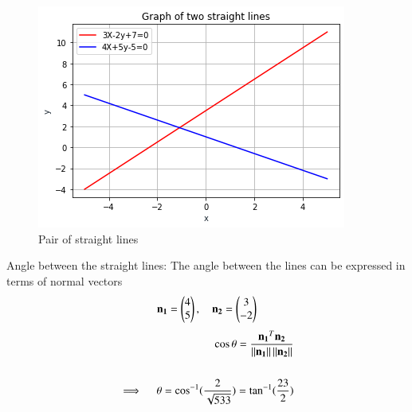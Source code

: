 \begin{figure}[h]
    \centering
    \includegraphics[width=\columnwidth]{./solutions/13/ex1/Figure.png}
    \caption{Pair of straight lines}
    \label{eq:solutions/13/ex1/Fig :1}
\end{figure}
{Angle between the straight lines: }
The angle between the lines can be expressed in terms of normal vectors 
\begin{align}
	\mathbf{n_1}=\begin{pmatrix}4\\5\end{pmatrix} , \quad \mathbf{n_2}=\begin{pmatrix}3\\-2\end{pmatrix}
\end{align}
\begin{align}
	\cos\theta=\frac{\mathbf{n_1}^T\mathbf{n_2}}{\left\lVert\mathbf{n_1}\right\rVert\left\lVert\mathbf{n_2}\right\rVert} \\
				\nonumber \\
	\implies \quad \theta=\cos^{-1}({\frac{2}{\sqrt{533}}}) = \tan^{-1}(\frac{23}{2})
\end{align}
